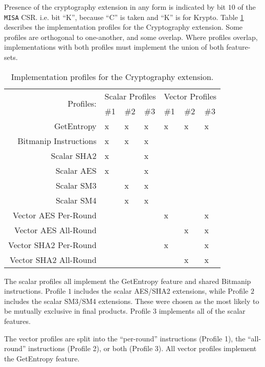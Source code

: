 
Presence of the cryptography extension in any form is indicated
by bit $10$ of the {\tt MISA} CSR.
i.e. bit ``K'', because ``C'' is taken and ``K'' is for Krypto.
Table \ref{tab:profiles} describes the implementation profiles for the
Cryptography extension.
Some profiles are orthogonal to one-another, and some overlap.
Where profiles overlap, implementations with both profiles must
implement the union of both feature-sets.


\begin{table}[h]
\centering
\begin{tabular}{r|lll|lll}
\multirow{2}{*}{Profiles:} &
\multicolumn{3}{c|}{Scalar Profiles} &
\multicolumn{3}{c}{Vector Profiles} \\
                      & \#1  & \#2  & \#3 & \#1  & \#2  & \#3 \\
\hline
GetEntropy            &   x  &   x  &  x  &   x  &  x   &  x  \\
Bitmanip Instructions &   x  &   x  &  x  &      &      &     \\
Scalar SHA2           &   x  &      &  x  &      &      &     \\
Scalar AES            &   x  &      &  x  &      &      &     \\
Scalar SM3            &      &   x  &  x  &      &      &     \\
Scalar SM4            &      &   x  &  x  &      &      &     \\
\hline
Vector AES Per-Round  &      &      &     &   x  &      &  x  \\
Vector AES All-Round  &      &      &     &      &  x   &  x  \\
Vector SHA2 Per-Round &      &      &     &   x  &      &  x  \\
Vector SHA2 All-Round &      &      &     &      &  x   &  x  
\end{tabular}
\caption{
Implementation profiles for the Cryptography extension.
}
\label{tab:profiles}
\end{table}

The scalar profiles all implement the GetEntropy feature and
shared Bitmanip instructions.
Profile $1$ includes the scalar AES/SHA2 extensions, while
Profile $2$ includes the scalar SM3/SM4  extensions.
These were chosen as the most likely to be mutually exclusive in final
products.
Profile $3$ implements all of the scalar features.

The vector profiles are split into the ``per-round'' instructions
(Profile 1),
the ``all-round'' instructions (Profile 2),
or both (Profile 3).
All vector profiles implement the GetEntropy feature.

